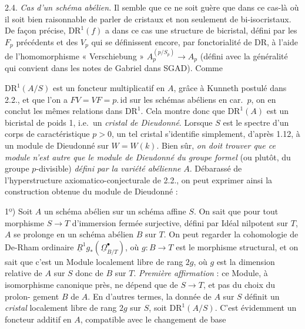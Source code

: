 \documentclass[11pt,a4paper]{article}
\begin{document}
2.4. \emph{Cas d'un schéma abélien.} Il semble que ce ne soit guère que dans ce
cas-là où il soit bien raisonnable de parler de cristaux et non
seulement de bi-isocristaux. De façon précise, $\mathrm{DR}^1(f)$ a dans ce
cas une structure de bicristal, défini par les $F_p$ précédents\supplied{,} et des
$V_p$ qui se définissent encore, par fonctorialité de $\mathrm{DR}$, à l'aide de
l'homomorphisme « Verschiebung » $A_p^{(p/S_p)}\to A_p$ (défini
avec la généralité qui convient dans les notes de Gabriel dans SGAD). Comme

$\mathrm{DR}^1(A/S)$ est un foncteur \struck{\ill{}} multiplicatif en $A$,
grâce à Kunneth postulé dans 2.2., et que l'on a
$FV=VF=p.\,\mathrm{id}$ sur les schémas abéliens en car.\ $p$, on en conclut
les mêmes relations dans $\mathrm{DR}^1$. Cela montre donc que
$\mathrm{DR}^1(A)$ est un bicristal de poids 1, i.e.\ un \emph{cristal de
Dieudonné}. Lorsque $S$ est le spectre d'un corps  de
caractéristique $p>0$, un tel cristal s'identifie simplement, d'après 1.12, à
un module de Dieudonné sur $W=W(k)$. Bien sûr, \emph{on doit trouver que ce
module n'est autre que le module de Dieudonné du groupe formel} \struck{\ill{}}
(ou plutôt, du groupe $p$-divisible) \emph{défini par la variété abélienne}
$A$. Débarassé de
l'hyperstructure axiomatico-conjecturale de 2.2.,  on peut
exprimer ainsi la construction  obtenue du module de Dieudonné :

1º) Soit $A$ un schéma abélien sur un schéma affine $S$. On sait que pour tout
morphisme $S\to T$ d'immersion fermée surjective, défini par Idéal nilpotent
sur $T$, $A$ se prolonge en un schéma abélien $B$ sur $T$. On peut regarder la
cohomologie de De-Rham ordinaire
$\underline{R}^1g_*(\underline{\Omega}^{\bullet}_{B/T})$, où $g\colon B\to T$
est le morphisme structural, et on sait que c'est un Module localement libre de
rang $2g$, où $g$ est la dimension relative de $A$ sur $S$ donc de $B$ sur $T$.
\emph{Première affirmation} : ce Module, à isomorphisme canonique près, ne
dépend que  de $S\to T$, et pas du choix du prolon-
gement $B$ de $A$. En d'autres termes, la donnée de $A$ sur $S$ définit un
\emph{cristal} localement libre de rang $2g$ sur $S$, soit
$\mathrm{DR}^1(A/S)$. C'est évidemment un foncteur additif en $A$, compatible
avec le changement de base
\end{document}
